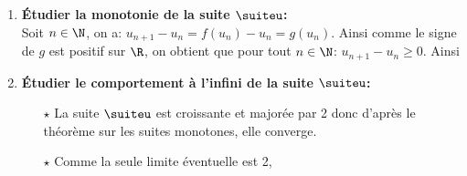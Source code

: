 \documentclass[a4paper, 11pt]{article}
\begin{document}
\begin{correction}
\begin{enumerate}
\begin{enumerate}
On montre par r\'ecurrence sur $n\in\N$ la propri\'et\'e $\mathcal{P}(n):\ u_n\ \hbox{existe et}\ u_n\in\left\rbrack \ddp\frac{2}{3},2\right\lbrack.$
\begin{itemize}
\item[$\star$] Initialisation: pour $n=0$: par d\'efinition de la suite, $u_0$ existe et $u_0\in\left\rbrack \ddp\frac{2}{3},2\right\lbrack$. Donc $\mathcal{P}(0)$ est vraie.
\item[$\star$] H\'er\'edit\'e: soit $n\in\N$ fix\'e, on suppose que la propri\'et\'e vraie \`{a} l'ordre $n$, montrons que $\mathcal{P}(n+1)$ est vraie.
Par hypoth\`{e}se de r\'ecurrence, on sait que $u_n$ existe et que $u_n\in\left\rbrack \ddp\frac{2}{3},2\right\lbrack$. Donc $f(u_n)$ existe c'est-\`{a}-dire $u_{n+1}$ existe.\\
De plus, $u_n\in\left\rbrack \ddp\frac{2}{3},2\right\lbrack$. Or l'intervalle $\left\rbrack \ddp\frac{2}{3},2\right\lbrack$ est stable par $f$. Donc $f(u_n)\in\left\rbrack \ddp\frac{2}{3},2\right\lbrack$ c'est-\`{a}-dire $u_{n+1}\in\left\rbrack \ddp\frac{2}{3},2\right\lbrack$. Donc $\mathcal{P}(n+1)$ est vraie.
\item[$\star$] Conclusion: il r\'esulte du principe de r\'ecurrence que

\end{itemize}
\item \textbf{\'Etudier la monotonie de la suite $\suiteu$:}\\
\noindent Soit $n\in\N$, on a: $u_{n+1}-u_n=f(u_n)-u_n=g(u_n)$. Ainsi comme le signe de $g$ est positif sur $\R$, on obtient que pour tout $n\in\N$: $u_{n+1}-u_n\geq 0$. Ainsi 
\item \textbf{\'Etudier le comportement \`{a} l'infini de la suite $\suiteu$:}
\begin{itemize}
\item[$\star$] La suite $\suiteu$ est croissante et major\'ee par 2 donc d'apr\`{e}s le th\'eor\`{e}me sur les suites monotones, elle converge.
\item[$\star$] Comme la seule limite \'eventuelle est 2, 
\end{itemize}
\end{enumerate} 
\end{enumerate}
\end{correction}
\end{document}
